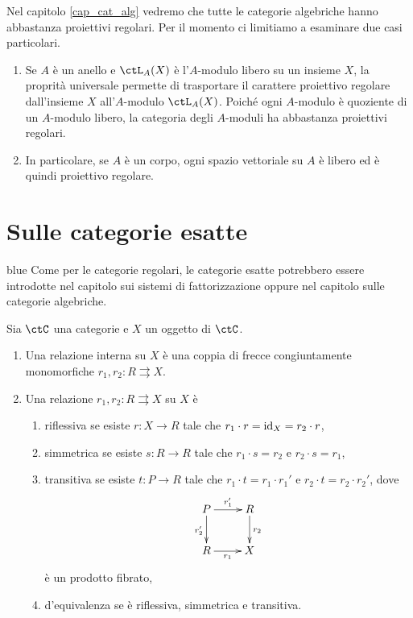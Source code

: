 \begin{examples}\label{esem_mod_pro}
 Nel capitolo \ref{cap_cat_alg} vedremo che tutte le categorie algebriche hanno abbastanza proiettivi regolari. Per il momento
 ci limitiamo a esaminare due casi particolari.
 \begin{enumerate}
  \item Se \(A\) è un anello e \(\ctL_A(X)\) è l'\(A\)-modulo libero su un insieme \(X\), la proprità universale permette di trasportare
        il carattere proiettivo regolare dall'insieme \(X\) all'\(A\)-modulo \(\ctL_A(X)\). Poiché ogni \(A\)-modulo è quoziente di un
        \(A\)-modulo libero, la categoria degli \(A\)-moduli ha abbastanza proiettivi regolari.
  \item In particolare, se \(A\) è un corpo, ogni spazio vettoriale su \(A\) è libero ed è quindi proiettivo regolare.
 \end{enumerate}
\end{examples}


\section{Sulle categorie esatte}\label{sec_cat_esatte}

\begin{color}{blue}
 Come per le categorie regolari, le categorie esatte potrebbero essere introdotte nel capitolo sui sistemi di fattorizzazione oppure
 nel capitolo sulle categorie algebriche.
\end{color}

\begin{definition}\label{def_relequiv_interne}
 Sia \(\ctC\) una categorie e \(X\) un oggetto di \(\ctC\).
 \begin{enumerate}
  \item Una relazione interna su \(X\) è una coppia di frecce congiuntamente monomorfiche \(r_1,r_2 \colon R \rightrightarrows X\).
  \item Una relazione \(r_1,r_2 \colon R \rightrightarrows X\) su \(X\) è
        \begin{enumerate}
         \item riflessiva se esiste \(r \colon X \to R\) tale che \(r_1 \cdot r = \mathrm{id}_X = r_2 \cdot r\),
         \item simmetrica se esiste \(s \colon R \to R\) tale che \(r_1 \cdot s = r_2\) e \(r_2 \cdot s = r_1\),
         \item transitiva se esiste \(t \colon P \to R\) tale che \(r_1 \cdot t = r_1 \cdot r_1'\) e \(r_2 \cdot t = r_2 \cdot r_2'\), dove
               \[\xymatrix{P \ar[d]_{r_2'} \ar[r]^-{r_1'} & R \ar[d]^{r_2} \\ R \ar[r]_-{r_1} & X}\]
               è un prodotto fibrato,
         \item d'equivalenza se è riflessiva, simmetrica e transitiva.
        \end{enumerate}
 \end{enumerate}
\end{definition}

